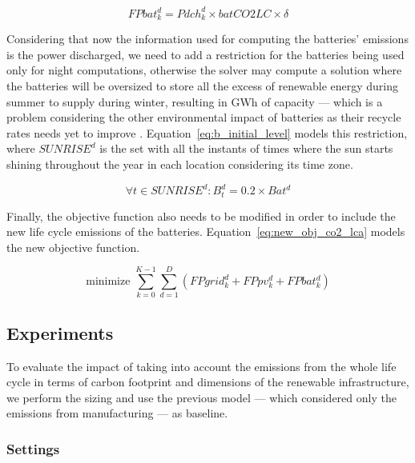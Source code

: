 \begin{equation} \label{eq:fbat_lca}
   FPbat^d_k =  Pdch^d_k \times batCO2LC \times \delta
 \end{equation}


Considering that now the information used for computing the batteries' emissions is the power discharged, we need to add a restriction for the batteries being used only for night computations, otherwise the solver may compute a solution where the batteries will be oversized to store all the excess of renewable energy during summer to supply during winter, resulting in GWh of capacity --- which is a problem considering the other environmental impact of batteries as their recycle rates needs yet to improve \cite{batteries_baumman}. Equation~\eqref{eq:b_initial_level}  models this restriction, where $SUNRISE^d$ is the set with all the instants of times where the sun starts shining throughout the year in each location considering its time zone.

\begin{equation} \label{eq:b_initial_level}
  \forall t \in SUNRISE^d :  B^d_t =  0.2 \times Bat^d
\end{equation}

Finally, the objective function also needs to be modified in order to include the new life cycle emissions of the batteries. Equation~\ref{eq:new_obj_co2_lca} models the new objective function.

\begin{equation} \label{eq:new_obj_co2_lca}
  \text{minimize }\sum_{k=0}^{K-1} \sum_{d=1}^D (FPgrid^d_k +  FPpv^d_k  + FPbat^d_k) 
\end{equation}



\subsection{Experiments}
To evaluate the impact of taking into account the emissions from the whole life cycle in terms of carbon footprint and dimensions of the renewable infrastructure, we perform the sizing and use the previous model --- which considered only the emissions from manufacturing --- as baseline. 




\label{sec:ex_lca_pv}

\subsubsection{Settings} 

